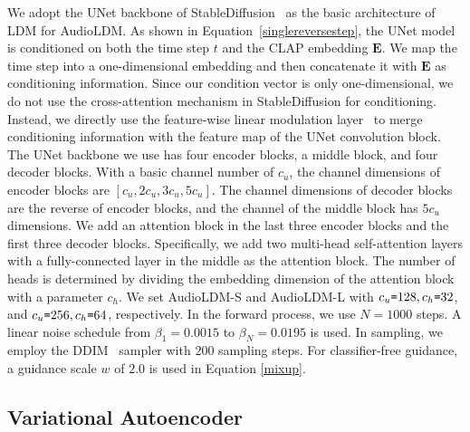 \documentclass{article}
\begin{document}
We adopt the UNet backbone of StableDiffusion~\cite{rombach2022high} as the basic architecture of LDM for AudioLDM. As shown in Equation~\ref{singlereversestep}, the UNet model is conditioned on both the time step $t$ and the CLAP embedding $\boldsymbol{E}$. We map the time step into a one-dimensional embedding and then concatenate it with $\boldsymbol{E}$ as conditioning information. Since our condition vector is only one-dimensional, we do not use the cross-attention mechanism in StableDiffusion for conditioning. Instead, we directly use the feature-wise linear modulation layer~\cite{perez2018film} to merge conditioning information with the feature map of the UNet convolution block. The UNet backbone we use has four encoder blocks, a middle block, and four decoder blocks. With a basic channel number of $c_{u}$, the channel dimensions of encoder blocks are $[c_{u}, 2c_{u}, 3c_{u}, 5c_{u}]$. The channel dimensions of decoder blocks are the reverse of encoder blocks, and the channel of the middle block has $5c_{u}$ dimensions. We add an attention block in the last three encoder blocks and the first three decoder blocks. Specifically, we add two multi-head self-attention layers with a fully-connected layer in the middle as the attention block. The number of heads is determined by dividing the embedding dimension of the attention block with a parameter $c_h$. We set AudioLDM-S and AudioLDM-L with $c_{u}\texttt{=}128, c_h\texttt{=}32$, and $c_{u}\texttt{=}256, c_h\texttt{=}64$, respectively. In the forward process, we use $N=1000$ steps. A linear noise schedule from $\beta_{1}=0.0015$ to $\beta_{N}=0.0195$ is used. In sampling, we employ the DDIM~\cite{song2020denoising} sampler with $200$ sampling steps. For classifier-free guidance, a guidance scale $w$ of $2.0$ is used in Equation \ref{mixup}.


\subsection{Variational Autoencoder}
\label{app:VAE}
\end{document}
